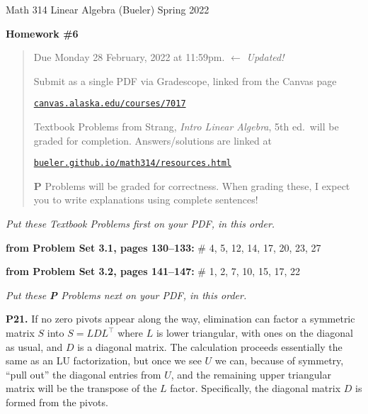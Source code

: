\documentclass[12pt]{amsart}
\newcommand{\prob}[1]{\bigskip\noindent\textbf{#1.}\quad }
\newcommand{\probset}[2]{\bigskip\noindent\textbf{from Problem Set #1, pages #2:}\quad }
\begin{document}
\scriptsize \noindent Math 314 Linear Algebra (Bueler) \hfill Spring 2022
\normalsize\medskip

\Large
\centerline{\textbf{Homework \#6}}

\normalsize
\bigskip
\begin{quote}
Due Monday 28 February, 2022 at 11:59pm.  \quad $\longleftarrow$ \emph{Updated!}

\medskip
\noindent Submit as a single PDF via Gradescope, linked from the Canvas page

\href{https://canvas.alaska.edu/courses/7017}{\texttt{canvas.alaska.edu/courses/7017}}

\noindent Textbook Problems from Strang, \emph{Intro Linear Algebra}, 5th ed.~will be graded for completion.  Answers/solutions are linked at

\href{https://bueler.github.io/math314/resources.html}{\texttt{bueler.github.io/math314/resources.html}}

\noindent \textbf{P} Problems will be graded for correctness.  When grading these, I expect you to write explanations using complete sentences!
\end{quote}
\medskip

\thispagestyle{empty}

\noindent \hrulefill

\noindent \emph{Put these Textbook Problems first on your PDF, in this order.}

\probset{3.1}{130--133} \# 4, 5, 12, 14, 17, 20, 23, 27

\probset{3.2}{141--147} \# 1, 2, 7, 10, 15, 17, 22


\bigskip
\noindent \hrulefill

\noindent \emph{Put these \textbf{P} Problems next on your PDF, in this order.}

\prob{P21}  If no zero pivots appear along the way, elimination can factor a symmetric matrix $S$ into $S=L D L^\top$ where $L$ is lower triangular, with ones on the diagonal as usual, and $D$ is a diagonal matrix.  The calculation proceeds essentially the same as an LU factorization, but once we see $U$ we can, because of symmetry, ``pull out'' the diagonal entries from $U$, and the remaining upper triangular matrix will be the transpose of the $L$ factor.  Specifically, the diagonal matrix $D$ is formed from the pivots.
\end{document}
